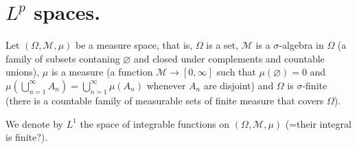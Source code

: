\documentclass{article}
\theoremstyle{definition}
\numberwithin{equation}{section}
\begin{document}
\section{$L^p$ spaces.}
Let $(\Omega,\mathcal{M},\mu)$ be a measure space, that is, $\Omega$ is a set, $\mathcal{M}$ is a $\sigma$-algebra in $\Omega$ (a family of subsets contaning $\varnothing$ and closed under complements and countable unions), $\mu$ is a measure (a function $\mathcal{M}\to[0,\infty]$ such that $\mu(\varnothing)=0$ and $\mu\left(\bigcup_{n=1}^\infty A_n\right)=\bigcup_{n=1}^\infty\mu(A_n)$ whenever $A_n$ are disjoint) and $\Omega$ is $\sigma$-finite (there is a countable family of measurable sets of finite measure that covers $\Omega$).

We denote by $L^1$ the space of integrable functions on $(\Omega,\mathcal{M},\mu)$ (=their integral is finite?).
\iffalse
\clearpage
\end{document}
